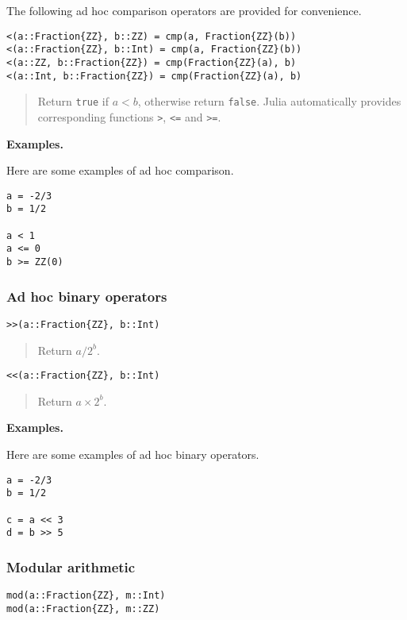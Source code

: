 \documentclass[a4paper,10pt]{article}
\newcommand{\code}{\lstinline}
\newcommand{\desc}[1]{\vspace{-3mm}\begin{quote}#1\end{quote}}
\begin{document}
{{{The following ad hoc comparison operators are provided for convenience.

\begin{lstlisting}
<(a::Fraction{ZZ}, b::ZZ) = cmp(a, Fraction{ZZ}(b))
<(a::Fraction{ZZ}, b::Int) = cmp(a, Fraction{ZZ}(b))
<(a::ZZ, b::Fraction{ZZ}) = cmp(Fraction{ZZ}(a), b)
<(a::Int, b::Fraction{ZZ}) = cmp(Fraction{ZZ}(a), b)
\end{lstlisting}

\desc{Return \code{true} if $a < b$, otherwise return \code{false}. Julia
automatically provides corresponding functions \code{>}, \code{<=} and
\code{>=}.}

\textbf{Examples.}

Here are some examples of ad hoc comparison.

\begin{lstlisting}
a = -2/3
b = 1/2

a < 1
a <= 0
b >= ZZ(0)
\end{lstlisting}

\subsubsection{Ad hoc binary operators}

\begin{lstlisting}
>>(a::Fraction{ZZ}, b::Int)
\end{lstlisting}

\desc{Return $a/2^b$.}

\begin{lstlisting}
<<(a::Fraction{ZZ}, b::Int)
\end{lstlisting}

\desc{Return $a\times 2^b$.}

\textbf{Examples.}

Here are some examples of ad hoc binary operators.

\begin{lstlisting}
a = -2/3
b = 1/2

c = a << 3
d = b >> 5
\end{lstlisting}

\subsubsection{Modular arithmetic}

\begin{lstlisting}
mod(a::Fraction{ZZ}, m::Int)
mod(a::Fraction{ZZ}, m::ZZ)
\end{lstlisting}

}}}
\end{document}
